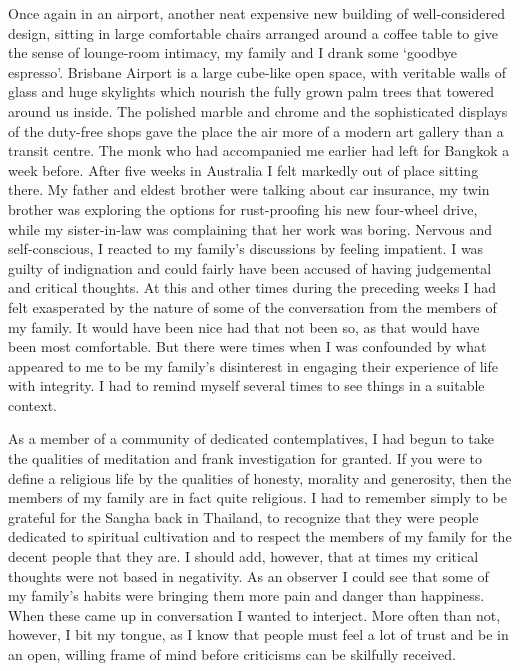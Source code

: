 Once again in an airport, another neat expensive new building of
well-considered design, sitting in large comfortable chairs arranged
around a coffee table to give the sense of lounge-room intimacy, my
family and I drank some `goodbye espresso'. Brisbane Airport is a large
cube-like open space, with veritable walls of glass and huge skylights
which nourish the fully grown palm trees that towered around us inside. 
The polished marble and chrome and the sophisticated displays of the
duty-free shops gave the place the air more of a modern art gallery than
a transit centre. The monk who had accompanied me earlier had left for
Bangkok a week before. After five weeks in Australia I felt markedly out
of place sitting there. My father and eldest brother were talking about
car insurance, my twin brother was exploring the options for
rust-proofing his new four-wheel drive, while my sister-in-law was
complaining that her work was boring. Nervous and self-conscious, I
reacted to my family's discussions by feeling impatient. I was guilty of
indignation and could fairly have been accused of having judgemental and
critical thoughts. At this and other times during the preceding weeks I
had felt exasperated by the nature of some of the conversation from the
members of my family. It would have been nice had that not been so, as
that would have been most comfortable. But there were times when I was
confounded by what appeared to me to be my family's disinterest in
engaging their experience of life with integrity. I had to remind myself
several times to see things in a suitable context. 

As a member of a community of dedicated contemplatives, I had begun to
take the qualities of meditation and frank investigation for granted. If
you were to define a religious life by the qualities of honesty, 
morality and generosity, then the members of my family are in fact quite
religious. I had to remember simply to be grateful for the Sangha back
in Thailand, to recognize that they were people dedicated to spiritual
cultivation and to respect the members of my family for the decent
people that they are. I should add, however, that at times my critical
thoughts were not based in negativity. As an observer I could see that
some of my family's habits were bringing them more pain and danger than
happiness. When these came up in conversation I wanted to interject. 
More often than not, however, I bit my tongue, as I know that people
must feel a lot of trust and be in an open, willing frame of mind before
criticisms can be skilfully received. 

